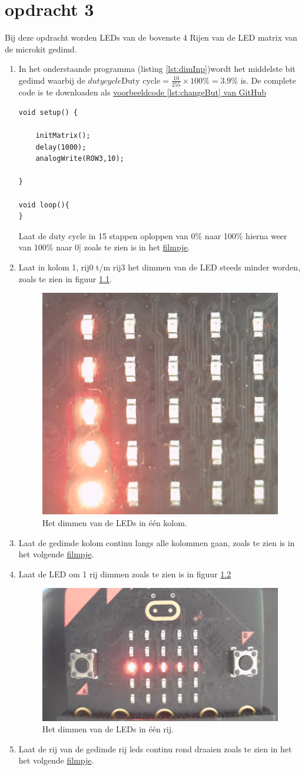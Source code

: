 \chapter{opdracht 3}

Bij deze opdracht worden LEDs van de bovenste 4 Rijen van de LED matrix van de microkit gedimd.
\begin{enumerate}[label=\Alph*.]
	\item In het onderstaande programma (listing \ref{lst:dimInp})wordt het middelste bit gedimd waarbij de
	$ duty cycle \text{Duty cycle} = \frac{10}{255} \times 100\% = 3.9\%$ is.
	De complete code  is te downloaden als \href{https://github.com/JohnVi-hhs/embsysP/tree/main/voorbeelden/dimOpdracht.ino}{voorbeeldcode \ref{lst:changeBut} van GitHub}
	\begin{lstlisting}[caption= Het dimmen van de LED,label={lst:dimInp}]
void setup() {  
	
	initMatrix();
	delay(1000);
	analogWrite(ROW3,10);
	
}

void loop(){
}

\end{lstlisting}
Laat de duty cycle in 15 stappen oploppen van 0\% naar 100\% hierna weer van 100\% naar 0| zoals te zien is in het \href{FadeInStapjesEnkeleLed.mp4}{filmpje}.
\item Laat in kolom 1, rij0 t/m rij3 het dimmen van de LED steeds minder worden, zoals te zien in figuur \ref{fig:dimledkol}.
\begin{figure}[h!]
	\captionsetup{justification=centering}
	\includegraphics[width=0.3 \linewidth]{figuren/dimledkol}
	\centering
	\caption{Het dimmen van de LEDs in één kolom.}
	\label{fig:dimledkol}
\end{figure}
\item Laat de gedimde kolom continu langs alle kolommen gaan, zoals te zien is in het volgende \href{FadeKolommen.mp4}{filmpje}.
	
\item Laat de LED om 1 rij dimmen zoals te zien is in figuur \ref{fig:rijDimLed}
\begin{figure}[H]
	\captionsetup{justification=centering}
	\includegraphics[width=0.3 \linewidth]{figuren/rijDimLed}
	\centering
	\caption{Het dimmen van de LEDs in één rij.}
	\label{fig:rijDimLed}
\end{figure}

\item Laat de rij van de gedimde rij leds continu rond draaien zoals te zien in het het volgende 
\href{FadeRijen.mp4}{filmpje}.
\end{enumerate}

